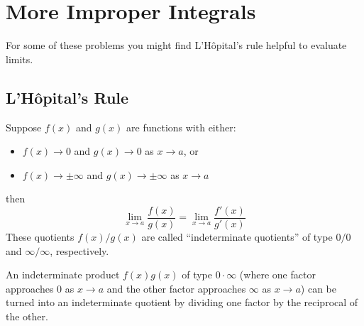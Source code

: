 \documentclass[12pt,letterpaper,fleqn]{article}
\theoremstyle{definition}
\begin{document}
\section*{More Improper Integrals}
%
For some of these problems you might find L'H\^opital's rule helpful to evaluate limits.
\subsection*{L'H\^opital's Rule}
Suppose $f(x)$ and $g(x)$ are functions with either:
\begin{itemize}
  \item $f(x)\to 0$ and $g(x)\to 0$ as $x\to a$, or
  \item $f(x)\to\pm\infty$ and $g(x)\to\pm\infty$ as $x\to a$
\end{itemize}
then
\begin{equation*}
  \lim_{x\to a}\frac{f(x)}{g(x)} = \lim_{x\to a}\frac{f'(x)}{g'(x)}
\end{equation*}
These quotients $f(x)/g(x)$ are called ``indeterminate quotients'' of type $0/0$ and $\infty/\infty$, respectively.

An indeterminate product $f(x)g(x)$ of type $0\cdot\infty$ (where one factor approaches $0$ as $x\to a$ and the other factor approaches $\infty$ as $x\to a$) can be turned into an indeterminate quotient by dividing one factor by the reciprocal of the other.
\end{document}
